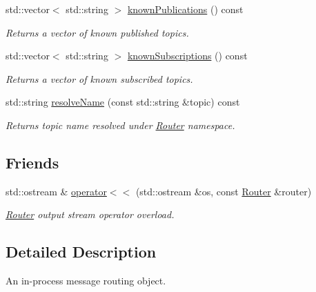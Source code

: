 \begin{DoxyCompactItemize}
\mbox{\label{classflow__ros_1_1_router_ab191406d34d07cd14ecfc484b501fe52}} 
std\+::vector$<$ std\+::string $>$ \hyperlink{classflow__ros_1_1_router_ab191406d34d07cd14ecfc484b501fe52}{known\+Publications} () const
\begin{DoxyCompactList}\small\item\em Returns a vector of known published topics. \end{DoxyCompactList}\item 
\mbox{\label{classflow__ros_1_1_router_abf8bb94e109ee8b0987aa50e35721874}} 
std\+::vector$<$ std\+::string $>$ \hyperlink{classflow__ros_1_1_router_abf8bb94e109ee8b0987aa50e35721874}{known\+Subscriptions} () const
\begin{DoxyCompactList}\small\item\em Returns a vector of known subscribed topics. \end{DoxyCompactList}\item 
std\+::string \hyperlink{classflow__ros_1_1_router_a3674f0a63ecdaed3619c6edeffa1b484}{resolve\+Name} (const std\+::string \&topic) const
\begin{DoxyCompactList}\small\item\em Returns topic name resolved under \hyperlink{classflow__ros_1_1_router}{Router} namespace. \end{DoxyCompactList}\end{DoxyCompactItemize}
\subsection*{Friends}
\begin{DoxyCompactItemize}
\item 
std\+::ostream \& \hyperlink{classflow__ros_1_1_router_a78e8ba9cec95e91e9abe6d8f83375feb}{operator$<$$<$} (std\+::ostream \&os, const \hyperlink{classflow__ros_1_1_router}{Router} \&router)
\begin{DoxyCompactList}\small\item\em \hyperlink{classflow__ros_1_1_router}{Router} output stream operator overload. \end{DoxyCompactList}\end{DoxyCompactItemize}


\subsection{Detailed Description}
An in-\/process message routing object. 

